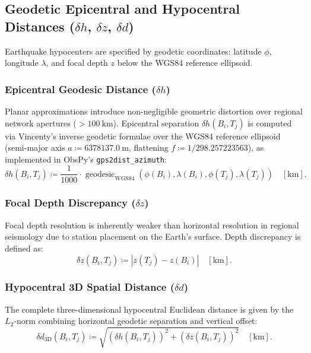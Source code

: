 \subsection{Geodetic Epicentral and Hypocentral Distances
  (\texorpdfstring{$\delta h$, $\delta z$, $\delta d$}{delta h, delta
z, delta d})}
Earthquake hypocenters are specified by geodetic coordinates:
latitude $\phi$, longitude $\lambda$, and focal depth $z$ below the
WGS84 reference ellipsoid.

\subsubsection{Epicentral Geodesic Distance ($\delta h$)}
Planar approximations  introduce
non-negligible geometric distortion over regional network apertures
($> \qty{100}{\kilo\meter}$). Epicentral separation $\delta h(B_i, T_j)$
is computed via Vincenty's inverse geodetic formulae over the WGS84
reference ellipsoid (semi-major axis $a \coloneqq \qty{6378137.0}{\meter}$,
flattening $f \coloneqq 1/\num{298.257223563}$), as implemented in ObsPy's
\parencite{ObsPy} \texttt{gps2dist\_azimuth}:
\begin{equation}
  \delta h(B_i, T_j) \coloneqq \frac{1}{\num{1000}} \cdot
  \operatorname{geodesic}_{\mathrm{WGS84}}\left( \phi(B_i), \lambda(B_i),
  \phi(T_j), \lambda(T_j) \right) \quad [\unit{\kilo\meter}].
\end{equation}

\subsubsection{Focal Depth Discrepancy ($\delta z$)}
Focal depth resolution is inherently weaker than horizontal
resolution in regional seismology due to station placement on the
Earth's surface. Depth discrepancy is defined as:
\begin{equation}
  \delta z(B_i, T_j) \coloneqq |z(T_j) - z(B_i)| \quad [\unit{\kilo\meter}].
\end{equation}

\subsubsection{Hypocentral 3D Spatial Distance ($\delta d$)}
The complete three-dimensional hypocentral Euclidean distance is
given by the $L_2$-norm combining horizontal geodetic separation and
vertical offset:
\begin{equation}
  \delta d_{3\mathrm{D}}(B_i, T_j) \coloneqq \sqrt{\left( \delta h(B_i, T_j)
  \right)^2 + \left( \delta z(B_i, T_j) \right)^2} \quad [\unit{\kilo\meter}].
\end{equation}

